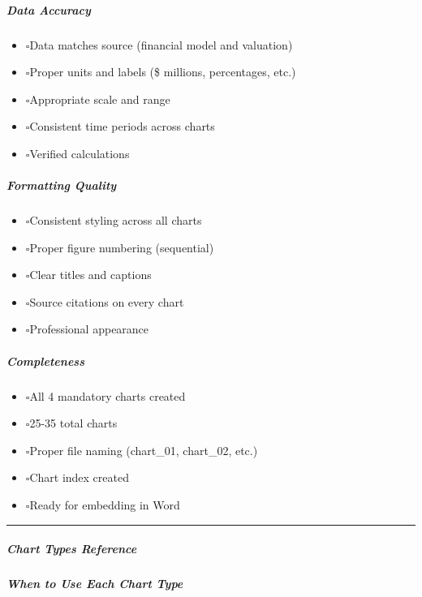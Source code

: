 \documentclass[11pt]{article}
\newcommand{\UncheckedBox}{$\square$}
\begin{document}
\subparagraph{Data Accuracy}\mbox{}\par
\begin{itemize}[leftmargin=*,itemsep=2pt,topsep=2pt]
\item {} \UncheckedBox Data matches source (financial model and valuation)
\item {} \UncheckedBox Proper units and labels (\$ millions, percentages, etc.)
\item {} \UncheckedBox Appropriate scale and range
\item {} \UncheckedBox Consistent time periods across charts
\item {} \UncheckedBox Verified calculations
\end{itemize}

\subparagraph{Formatting Quality}\mbox{}\par
\begin{itemize}[leftmargin=*,itemsep=2pt,topsep=2pt]
\item {} \UncheckedBox Consistent styling across all charts
\item {} \UncheckedBox Proper figure numbering (sequential)
\item {} \UncheckedBox Clear titles and captions
\item {} \UncheckedBox Source citations on every chart
\item {} \UncheckedBox Professional appearance
\end{itemize}

\subparagraph{Completeness}\mbox{}\par
\begin{itemize}[leftmargin=*,itemsep=2pt,topsep=2pt]
\item {} \UncheckedBox All 4 mandatory charts created
\item {} \UncheckedBox 25-35 total charts
\item {} \UncheckedBox Proper file naming (chart\_\allowbreak{}01, chart\_\allowbreak{}02, etc.)
\item {} \UncheckedBox Chart index created
\item {} \UncheckedBox Ready for embedding in Word
\end{itemize}

\vspace{0.5em}\hrule\vspace{0.5em}

\subparagraph{Chart Types Reference}\mbox{}\par

\subparagraph{When to Use Each Chart Type}\mbox{}\par
\end{document}
